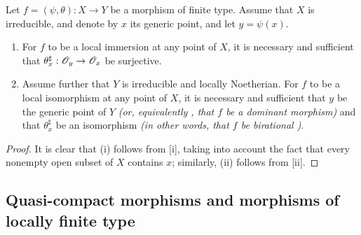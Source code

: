 \begin{cor}[6.5.5]
\label{1.6.5.5}
Let $f=(\psi,\theta):X\to Y$ be a morphism of finite type.
Assume that $X$ is irreducible, and denote by $x$ its generic point, and let $y=\psi(x)$.
\begin{enumerate}[label=\emph{(\roman*)}]
  \item For $f$ to be a local immersion at any point of $X$, it is necessary and sufficient that $\theta_x^\sharp:\mathscr{O}_y\to\mathscr{O}_x$ be surjective.
  \item Assume further that $Y$ is irreducible and locally Noetherian.
    For $f$ to be a local isomorphism at any point of $X$, it is necessary and sufficient that $y$ be the generic point of $Y$ \emph{(or, equivalently , that $f$ be a \emph{dominant} morphism)} and that $\theta_x^\sharp$ be an isomorphism \emph{(in other words, that $f$ be \emph{birational} )}.
\end{enumerate}
\end{cor}

\begin{proof}
\label{proof-1.6.5.5}
It is clear that (i) follows from [i], taking into account the fact that every nonempty open subset of $X$ contains $x$;
similarly, (ii) follows from [ii].
\end{proof}

\subsection{Quasi-compact morphisms and morphisms of locally finite type}
\label{subsection-quasi-compact-morphisms-and-morphisms-of-locally-finite-type}
